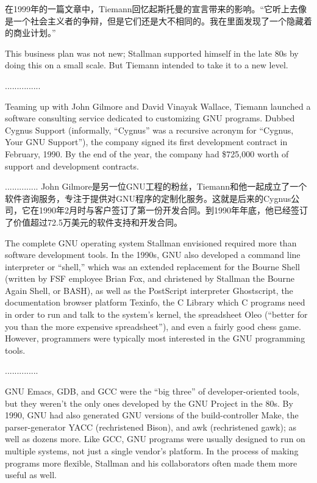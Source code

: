\ifdefined\chs
在1999年的一篇文章中，Tiemann回忆起斯托曼的宣言带来的影响。``它听上去像是一个社会主义者的争辩，但是它们还是大不相同的。我在里面发现了一个隐藏着的商业计划。'' 
\fi

\ifdefined\eng
This business plan was not new; Stallman supported himself in the late 80s by doing this on a small scale.  But Tiemann intended to take it to a new level.
\fi

\ifdefined\chs
...............
\fi

\ifdefined\eng
Teaming up with John Gilmore and David Vinayak Wallace, Tiemann launched a software consulting service dedicated to customizing GNU programs. Dubbed Cygnus Support (informally, ``Cygnus'' was a recursive acronym for ``Cygnus, Your GNU Support''), the company signed its first development contract in February, 1990. By the end of the year, the company had \$725,000 worth of support and development contracts.
\fi

\ifdefined\chs
..............
John Gilmore是另一位GNU工程的粉丝，Tiemann和他一起成立了一个软件咨询服务，专注于提供对GNU程序的定制化服务。这就是后来的Cygnus公司，它在1990年2月时与客户签订了第一份开发合同。到1990年年底，他已经签订了价值超过72.5万美元的软件支持和开发合同。
\fi

\ifdefined\eng
The complete GNU operating system Stallman envisioned required more than software development tools.  In the 1990s, GNU also developed a command line interpreter or ``shell,'' which was an extended replacement for the Bourne Shell (written by FSF employee Brian Fox, and christened by Stallman the Bourne Again Shell, or BASH), as well as the PostScript interpreter Ghostscript, the documentation browser platform Texinfo, the C Library which C programs need in order to run and talk to the system's kernel, the spreadsheet Oleo (``better for you than the more expensive spreadsheet''), and even a fairly good chess game.  However, programmers were typically most interested in the GNU programming tools.
\fi

\ifdefined\chs
..............
\fi

\ifdefined\eng
GNU Emacs, GDB, and GCC were the ``big three'' of developer-oriented tools, but they weren't the only ones developed by the GNU Project in the 80s. By 1990, GNU had also generated GNU versions of the build-controller Make, the parser-generator YACC (rechristened Bison), and awk (rechristened gawk); as well as dozens more. Like GCC, GNU programs were usually designed to run on multiple systems, not just a single vendor's platform. In the process of making programs more flexible, Stallman and his collaborators often made them more useful as well.
\fi

